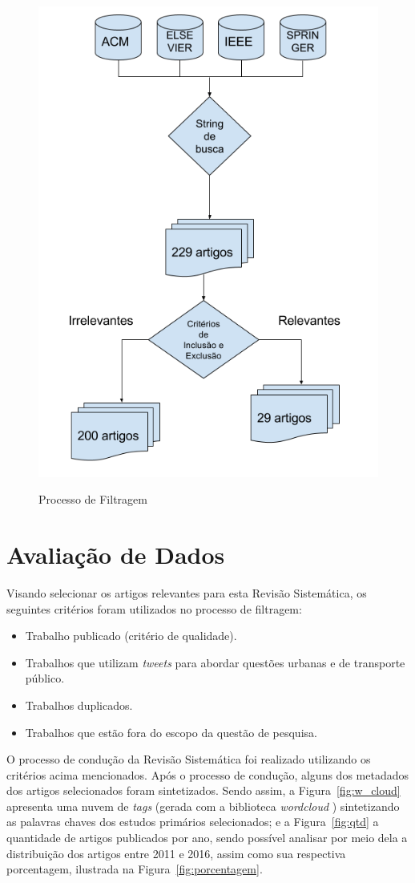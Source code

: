 \documentclass[
	12pt,				%
	oneside,			%
	a4paper,			%
	english,			%
	brazil				%
	]{abntex2ppgsi}
\begin{document}
{{{\begin{figure}[H]%
	\centering
 	  \caption{Processo de Filtragem}
		\includegraphics[width=0.5\linewidth]{images/metodologia_metodologia.png}
	\label{fig:filter}
\end{figure}

\section{Avaliação de Dados}
\label{avaliacao}

Visando selecionar os artigos relevantes para esta Revisão Sistemática, os seguintes critérios foram utilizados no processo de filtragem:

\begin{itemize}
\item Trabalho publicado (critério de qualidade).
\item Trabalhos que utilizam \textit{tweets} para abordar questões urbanas e de transporte público.
\item Trabalhos duplicados.
\item Trabalhos que estão fora do escopo da questão de pesquisa.
\end{itemize}

O processo de condução da Revisão Sistemática foi realizado utilizando os critérios acima mencionados. Após o processo de condução, alguns dos metadados dos artigos selecionados foram sintetizados. Sendo assim, a Figura~\ref{fig:w_cloud} apresenta uma nuvem de \textit{tags} (gerada com a biblioteca \textit{wordcloud} \cite{wordcloud}) sintetizando as palavras chaves dos estudos primários selecionados; e a Figura~\ref{fig:qtd} a quantidade de artigos publicados por ano, sendo possível analisar por meio dela a distribuição dos artigos entre 2011 e 2016, assim como sua respectiva porcentagem, ilustrada na Figura~\ref{fig:porcentagem}.

}}}
\end{document}
